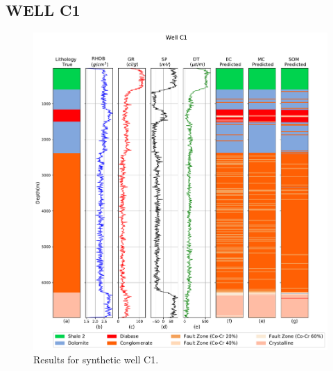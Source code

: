 \documentclass[preprint,12pt]{elsarticle}
\begin{document}
\subsection{WELL C1}
\label{subsub:C1}
\begin{figure}[!htb]
	\centering
	\includegraphics[scale=0.55]{imagens/wellC1nx80v02.pdf}
	\caption{Results for synthetic well C1.  }
	\label{fig:well_C1}
\end{figure}
\end{document}

